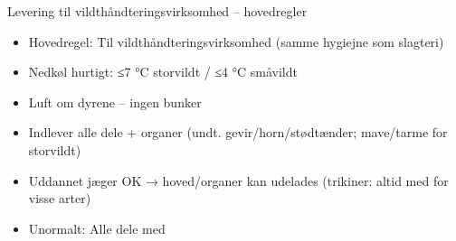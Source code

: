 \begin{frame}{Levering til vildthåndteringsvirksomhed – hovedregler}
    \begin{itemize}
        \item Hovedregel: Til vildthåndteringsvirksomhed (samme hygiejne som slagteri)
        \item Nedkøl hurtigt: ≤7 °C storvildt / ≤4 °C småvildt
        \item Luft om dyrene – ingen bunker
        \item Indlever alle dele + organer (undt. gevir/horn/stødtænder; mave/tarme for storvildt)
        \item Uddannet jæger OK → hoved/organer kan udelades (trikiner: altid med for visse arter)
        \item Unormalt: Alle dele med
    \end{itemize}
\end{frame}